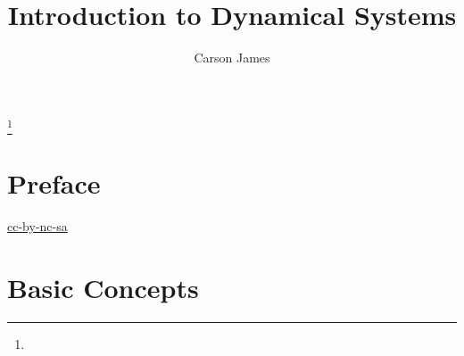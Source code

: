 \documentclass{book}
\begin{document}
	
	\frontmatter
	
	\title{Introduction to Dynamical Systems}
	
	
	\author{Carson James}
	\thanks{}
	
	\date{}
	
	\maketitle
	
	
	\setcounter{page}{4}
	
	\tableofcontents
	\printunsrtglossary[type=symbols,style=long,title={Notation}]
	
	
	\mainmatter
	
	\chapter*{Preface}
	
	\begin{flushleft}
		\href{https://creativecommons.org/licenses/by-nc-sa/4.0/legalcode.txt}{cc-by-nc-sa}
	\end{flushleft}
	
	\newpage
	
	
	
	
	
	
	
	
	
	
	
	
	
	
	
	
	\chapter{Basic Concepts}
	
\end{document}
